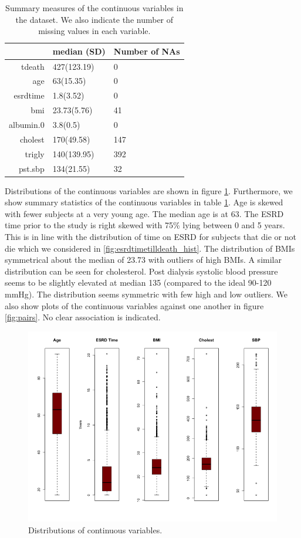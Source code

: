 \documentclass[paper=a4, fontsize=11pt]{scrartcl} %
\numberwithin{equation}{section} %
\numberwithin{figure}{section} %
\numberwithin{table}{section} %
\begin{document}
\begin{table}[ht]
\centering
\begin{tabular}{rll}
  \hline
 & median (SD) & Number of NAs \\ 
  \hline
tdeath & 427(123.19) & 0 \\ 
  age & 63(15.35) & 0 \\ 
  esrdtime & 1.8(3.52) & 0 \\ 
  bmi & 23.73(5.76) & 41 \\ 
  albumin.0 & 3.8(0.5) & 0 \\ 
  cholest & 170(49.58) & 147 \\ 
  trigly & 140(139.95) & 392 \\ 
  pst.sbp & 134(21.55) & 32 \\ 
   \hline
\end{tabular}
\caption{Summary measures of the continuous variables in the dataset. We also indicate the number of missing values in each variable.}
\label{tab:cont}
\end{table}

Distributions of the continuous variables are shown in figure \ref{fig:cont_box}. Furthermore, we show summary statistics of the continuous variables in table \ref{tab:cont}. Age is skewed with fewer subjects at a very young age. The median age is at 63. The ESRD time prior to the study is right skewed with 75\% lying between 0 and 5 years. This is in line with the distribution of time on ESRD for subjects that die or not die which we considered in \ref{fig:esrdtimetilldeath_hist}. The distribution of BMIs symmetrical about the median of 23.73 with outliers of high BMIs. A similar distribution can be seen for cholesterol. Post dialysis systolic blood pressure seems to be slightly elevated at median 135 (compared to the ideal 90-120 mmHg). The distribution seems symmetric with few high and low outliers. We also show plots of the continuous variables against one another in figure \ref{fig:pairs}. No clear association is indicated.

\begin{figure}[H]
\centering
\includegraphics[width=.6\textwidth]{plots/cont_box.png}
\caption{Distributions of continuous variables.}
\label{fig:cont_box}
\end{figure}
\end{document}
